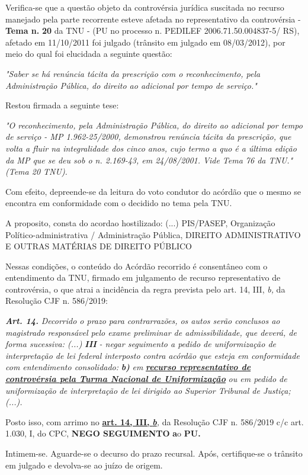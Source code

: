 \documentclass[12pt]{article}
\begin{document}
\justifying
\noindent Verifica-se que a questão objeto da controvérsia jurídica suscitada no recurso manejado pela parte recorrente esteve afetada no representativo da controvérsia - \textbf{Tema n. }\textbf{20} da TNU - (PU no processo n. PEDILEF 2006.71.50.004837-5/ RS),  afetado em 11/10/2011 foi julgado (trânsito em julgado em 08/03/2012), por meio do qual foi elucidada a seguinte questão:

\noindent \textit{"Saber se há renúncia tácita da prescrição com o reconhecimento, pela Administração Pública, do direito ao adicional por tempo de serviço."}

\noindent Restou firmada a seguinte tese:

\noindent \textit{"O reconhecimento, pela Administração Pública, do direito ao adicional por tempo de serviço - MP 1.962-25/2000, demonstrou renúncia tácita da prescrição, que volta a fluir na integralidade dos cinco anos, cujo termo a quo é a última edição da MP que se deu sob o n. 2.169-43, em 24/08/2001. Vide Tema 76 da TNU." (Tema 20 TNU).}

\noindent Com efeito, depreende-se da leitura do voto condutor do acórdão que o mesmo se encontra em conformidade com o decidido no  tema pela TNU.

\noindent A proposito, consta do acordao hostilizado: (...) PIS/PASEP, Organização Político-administrativa / Administração Pública, DIREITO ADMINISTRATIVO E OUTRAS MATÉRIAS DE DIREITO PÚBLICO

\noindent Nessas condições, o conteúdo do Acórdão recorrido é consentâneo com o entendimento da TNU, firmado em julgamento de recurso representativo de controvérsia, o que atrai a incidência da regra prevista pelo art. 14, III, \textit{b,} da Resolução CJF n. 586/2019:

\noindent \textit{\textbf{Art. 14.}}\textit{ Decorrido o prazo para contrarrazões, os autos serão conclusos ao magistrado responsável pelo exame preliminar de admissibilidade, que deverá, de forma sucessiva: (...) }\textit{\textbf{III }}\textit{- negar seguimento a pedido de uniformização de interpretação de lei federal interposto contra acórdão que esteja em conformidade com entendimento consolidado: }\textit{\textbf{b)}}\textit{ em }\uline{\textit{\textbf{recurso representativo de controvérsia pela Turma Nacional de Uniformização}}}\textit{ ou em pedido de uniformização de interpretação de lei dirigido ao Superior Tribunal de Justiça;(...).}

\noindent Posto isso, com arrimo no \uline{\textbf{art. 14, III, }}\uline{\textit{\textbf{b}}}\textit{,} da Resolução CJF n. 586/2019 c/c art. 1.030, I, do CPC, \textbf{NEGO SEGUIMENTO }\textbf{a}o\textbf{ PU}\textbf{.}

\noindent Intimem-se. Aguarde-se o decurso do prazo recursal. Após, certifique-se o trânsito em julgado e devolva-se ao juízo de origem.
\end{document}
